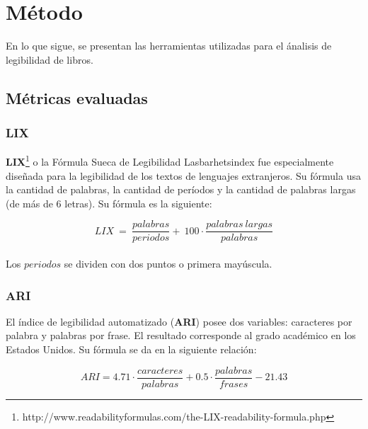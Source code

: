 \documentclass[12pt,journal,compsoc]{IEEEtran}
\begin{document}

\section{Método}

En lo que sigue, se presentan las herramientas utilizadas para el ánalisis de legibilidad de libros.

\subsection{Métricas evaluadas}
\subsubsection{LIX}

\textbf{LIX}\footnote{http://www.readabilityformulas.com/the-LIX-readability-formula.php} o la Fórmula Sueca de Legibilidad Lasbarhetsindex fue especialmente diseñada para la legibilidad de los textos de lenguajes extranjeros. Su fórmula usa la cantidad de palabras, la cantidad de períodos y la cantidad de palabras largas (de más de 6 letras). Su fórmula es la siguiente:

$$LIX\ =\ \frac{palabras}{periodos} + \ 100 \cdot \frac{palabras\ largas}{palabras}$$\\

Los $periodos$ se dividen con dos puntos o primera mayúscula.\\

\subsubsection{ARI}
El índice de legibilidad automatizado (\textbf{ARI}) posee dos variables: caracteres por palabra y palabras por frase. El resultado corresponde al grado académico en los Estados Unidos. Su fórmula se da en la siguiente relación:

$$ARI = 4.71\cdot \frac{caracteres}{palabras}+0.5\cdot \frac{palabras}{frases} - 21.43$$
\end{document}
